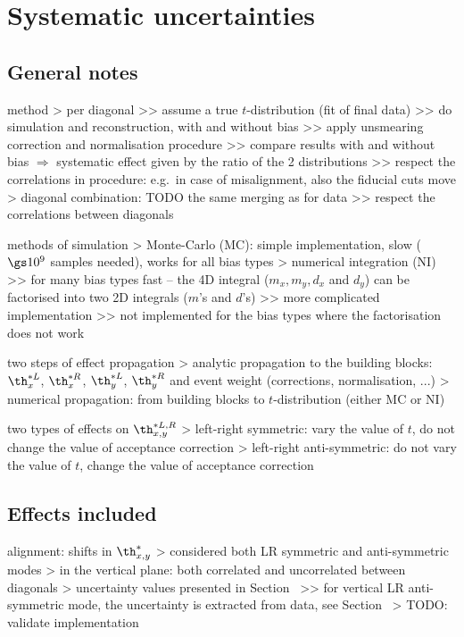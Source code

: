 \chapter[systematics]{Systematic uncertainties}

\section[systematics-general]{General notes}

\> method
\>> per diagonal
\>>> assume a true $t$-distribution (fit of final data)
\>>> do simulation and reconstruction, with and without bias
\>>> apply unsmearing correction and normalisation procedure
\>>> compare results with and without bias $\Rightarrow$ systematic effect given by the ratio of the 2 distributions
\>>> respect the correlations in procedure: e.g.~in case of misalignment, also the fiducial cuts move
\>> diagonal combination: TODO the same merging as for data
\>>> respect the correlations between diagonals

 methods of simulation
\>> Monte-Carlo (MC): simple implementation, slow ($\gs 10^9$ samples needed), works for all bias types
\>> numerical integration (NI)
\>>> for many bias types fast -- the 4D integral ($m_x, m_y, d_x$ and $d_y$) can be factorised into two 2D integrals ($m$'s and $d$'s)
\>>> more complicated implementation
\>>> not implemented for the bias types where the factorisation does not work

\> two steps of effect propagation
\>> analytic propagation to the building blocks: $\th^{*L}_x$, $\th^{*R}_x$, $\th^{*L}_y$, $\th^{*R}_y$ and event weight (corrections, normalisation, ...)
\>> numerical propagation: from building blocks to $t$-distribution (either MC or NI)

\> two types of effects on $\th^{*L,R}_{x, y}$
\>> left-right symmetric: vary the value of $t$, do not change the value of acceptance correction
\>> left-right anti-symmetric: do not vary the value of $t$, change the value of acceptance correction


\section[systematics-effects]{Effects included}

\> alignment: shifts in $\th^*_{x,y}$
\>> considered both LR symmetric and anti-symmetric modes
\>> in the vertical plane: both correlated and uncorrelated between diagonals
\>> uncertainty values presented in Section~
\>>> for vertical LR anti-symmetric mode, the uncertainty is extracted from data, see Section~
\>> TODO: validate implementation

